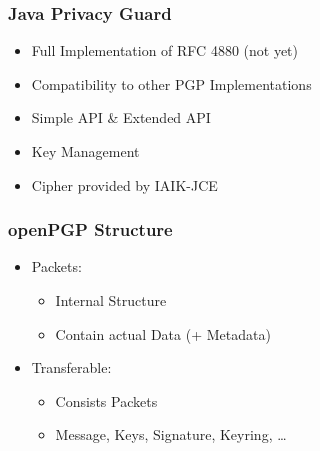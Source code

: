 \documentclass{beamer}
\begin{document}
\begin{frame}
	\frametitle{Java Privacy Guard}
	
	\begin{itemize}
		\item Full Implementation of RFC 4880 (not yet)
		\item Compatibility to other PGP Implementations
		\item Simple API \&{} Extended API
		\item Key Management
	\end{itemize}
	
	\begin{itemize}
		\item Cipher provided by IAIK-JCE
	\end{itemize}
	
\end{frame}


\begin{frame}


	\frametitle{openPGP Structure}
	
	\begin{itemize}
		\item Packets: 
		\begin{itemize}
			\item Internal Structure
			\item Contain actual Data (+ Metadata)
		\end{itemize}
		
		\item Transferable:
		\begin{itemize}
			\item Consists Packets
			\item Message, Keys, Signature, Keyring, \ldots
		\end{itemize}
	\end{itemize}
	

\end{frame}
\end{document}
